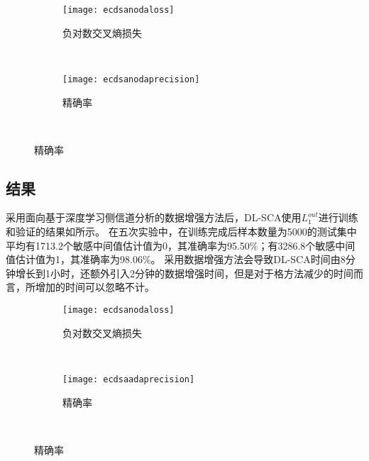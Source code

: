 {{	\begin{figure}[!h]
		\centering
		\begin{subfigure}[b]{\twof\textwidth}
			\texttt{[image: ecdsanodaloss]}
			\caption{负对数交叉熵损失}
			\label{fig:ecdsanodaloss}
		\end{subfigure}%
		~%
		\begin{subfigure}[b]{\twof\textwidth}
			\texttt{[image: ecdsanodaprecision]}
			\caption{精确率}
			\label{fig:ecdsanodaprecision}
		\end{subfigure}
		\\
		\label{fig:ecdsanoda}
	\end{figure}

	\subsection{\shujuzengqiang 结果}
	
	采用面向基于深度学习侧信道分析的数据增强方法后，DL-SCA使用$L_1^{out}$进行训练和验证的结果如所示。%
	在五次实验中，在训练完成后样本数量为5000的测试集中平均有1713.2个敏感中间值估计值为0，其准确率为95.50\%；有3286.8个敏感中间值估计值为1，其准确率为98.06\%。
	采用数据增强方法会导致DL-SCA时间由8分钟增长到1小时，还额外引入2分钟的数据增强时间，但是对于格方法减少的时间而言，所增加的时间可以忽略不计。
	
	\begin{figure}[!h]
		\centering
		\begin{subfigure}[b]{\twof\textwidth}
			\texttt{[image: ecdsanodaloss]}
			\caption{负对数交叉熵损失}
			\label{fig:ecdsaadaloss}
		\end{subfigure}%
		~%
		\begin{subfigure}[b]{\twof\textwidth}
			\texttt{[image: ecdsaadaprecision]}
			\caption{精确率}
			\label{fig:ecdsaadaprecision}
		\end{subfigure}
		\\
		\label{fig:ecdsaada}
	\end{figure}

}}
